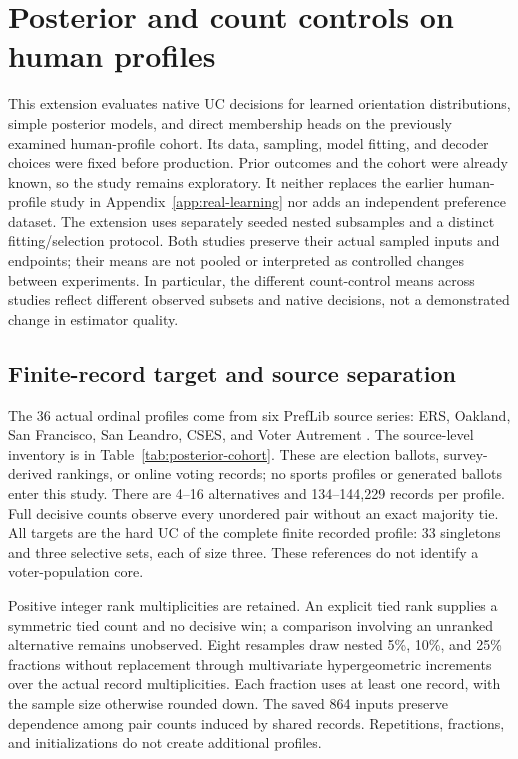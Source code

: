 \section{Posterior and count controls on human profiles}\label{app:posterior-native}
This extension evaluates native UC decisions for learned orientation distributions, simple posterior models, and direct membership heads on the previously examined human-profile cohort. Its data, sampling, model fitting, and decoder choices were fixed before production. Prior outcomes and the cohort were already known, so the study remains exploratory. It neither replaces the earlier human-profile study in Appendix~\ref{app:real-learning} nor adds an independent preference dataset. The extension uses separately seeded nested subsamples and a distinct fitting/selection protocol. Both studies preserve their actual sampled inputs and endpoints; their means are not pooled or interpreted as controlled changes between experiments. In particular, the different count-control means across studies reflect different observed subsets and native decisions, not a demonstrated change in estimator quality.

\subsection{Finite-record target and source separation}
The 36 actual ordinal profiles come from six PrefLib source series: ERS, Oakland, San Francisco, San Leandro, CSES, and Voter Autrement \citep{mattei2013preflib,preflibers,oneill2013openstv,preflibcses,preflibvoterautrement}. The source-level inventory is in Table~\ref{tab:posterior-cohort}. These are election ballots, survey-derived rankings, or online voting records; no sports profiles or generated ballots enter this study. There are 4--16 alternatives and 134--144,229 records per profile. Full decisive counts observe every unordered pair without an exact majority tie. All targets are the hard UC of the complete finite recorded profile: 33 singletons and three selective sets, each of size three. These references do not identify a voter-population core.

Positive integer rank multiplicities are retained. An explicit tied rank supplies a symmetric tied count and no decisive win; a comparison involving an unranked alternative remains unobserved. Eight resamples draw nested 5\%, 10\%, and 25\% fractions without replacement through multivariate hypergeometric increments over the actual record multiplicities. Each fraction uses at least one record, with the sample size otherwise rounded down. The saved 864 inputs preserve dependence among pair counts induced by shared records. Repetitions, fractions, and initializations do not create additional profiles.

